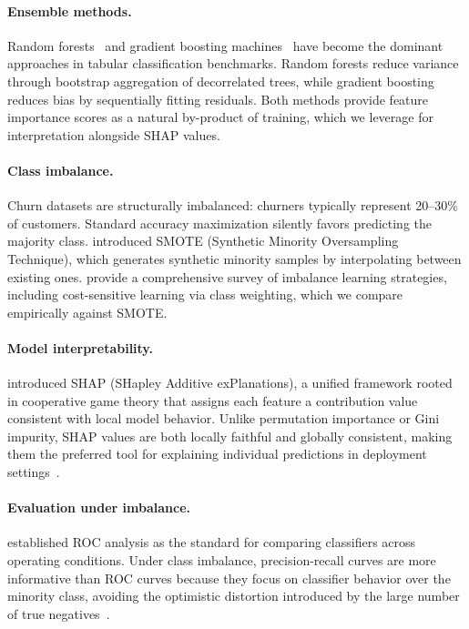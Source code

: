 \documentclass{article}
\begin{document}
\paragraph{Ensemble methods.}
Random forests~\citep{breiman2001} and gradient boosting machines~\citep{friedman2001}
have become the dominant approaches in tabular classification benchmarks. Random forests
reduce variance through bootstrap aggregation of decorrelated trees, while gradient
boosting reduces bias by sequentially fitting residuals. Both methods provide
feature importance scores as a natural by-product of training, which we leverage for
interpretation alongside SHAP values.

\paragraph{Class imbalance.}
Churn datasets are structurally imbalanced: churners typically represent 20--30\% of
customers. Standard accuracy maximization silently favors predicting the majority class.
\citet{chawla2002} introduced SMOTE (Synthetic Minority Oversampling Technique), which
generates synthetic minority samples by interpolating between existing ones.
\citet{heGarcia2009} provide a comprehensive survey of imbalance learning strategies,
including cost-sensitive learning via class weighting, which we compare empirically
against SMOTE.

\paragraph{Model interpretability.}
\citet{lundberg2017} introduced SHAP (SHapley Additive exPlanations), a unified
framework rooted in cooperative game theory that assigns each feature a contribution
value consistent with local model behavior. Unlike permutation importance or Gini
impurity, SHAP values are both locally faithful and globally consistent, making them
the preferred tool for explaining individual predictions in deployment
settings~\citep{molnar2020}.

\paragraph{Evaluation under imbalance.}
\citet{fawcett2006} established ROC analysis as the standard for comparing classifiers
across operating conditions. Under class imbalance, precision-recall curves are
more informative than ROC curves because they focus on classifier behavior over the
minority class, avoiding the optimistic distortion introduced by the large number of
true negatives~\citep{davis2006}.
\end{document}
